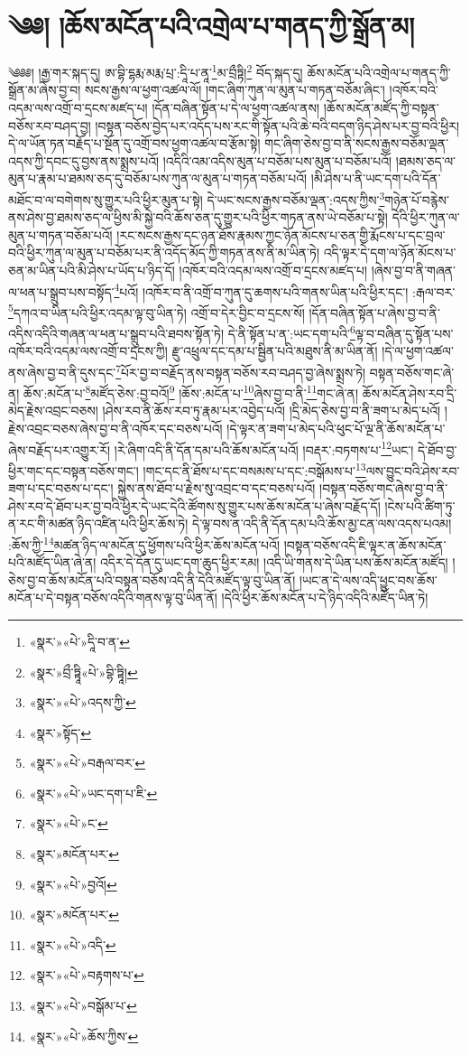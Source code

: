 \chapter{༄༅། །ཆོས་མངོན་པའི་འགྲེལ་པ་གནད་ཀྱི་སྒྲོན་མ།}༄༅༅། །རྒྱ་གར་སྐད་དུ། ཨ་བྷི་དྷརྨ་མརྨ་པྲ་:དཱི་པ་ནཱ་\footnote{«སྣར་»«པེ་»དཱི་བ་ན་}མ་བྲྀཏྟི།\footnote{«སྣར་»བྲྀ་ཏྟཱི«པེ་»བྷི་ཏྟཱི།} བོད་སྐད་དུ། ཆོས་མངོན་པའི་འགྲེལ་པ་གནད་ཀྱི་སྒྲོན་མ་ཞེས་བྱ་བ། སངས་རྒྱས་ལ་ཕྱག་འཚལ་ལོ། །གང་ཞིག་ཀུན་ལ་མུན་པ་གཏན་བཅོམ་ཞིང་། །འཁོར་བའི་འདམ་ལས་འགྲོ་བ་དྲངས་མཛད་པ། །དོན་བཞིན་སྟོན་པ་དེ་ལ་ཕྱག་འཚལ་ནས། །ཆོས་མངོན་མཛོད་ཀྱི་བསྟན་བཅོས་རབ་བཤད་བྱ། །བསྟན་བཅོས་བྱེད་པར་འདོད་པས་རང་གི་སྟོན་པའི་ཆེ་བའི་བདག་ཉིད་ཤེས་པར་བྱ་བའི་ཕྱིར། དེ་ལ་ཡོན་ཏན་བརྗོད་པ་སྔོན་དུ་འགྲོ་བས་ཕྱག་འཚལ་བ་རྩོམ་སྟེ། གང་ཞིག་ཅེས་བྱ་བ་ནི་སངས་རྒྱས་བཅོམ་ལྡན་འདས་ཀྱི་དབང་དུ་བྱས་ནས་སྨྲས་པའོ། །འདིའི་འམ་འདིས་མུན་པ་བཅོམ་པས་མུན་པ་བཅོམ་པའོ། །ཐམས་ཅད་ལ་མུན་པ་རྣམ་པ་ཐམས་ཅད་དུ་བཅོམ་པས་ཀུན་ལ་མུན་པ་གཏན་བཅོམ་པའོ། །མི་ཤེས་པ་ནི་ཡང་དག་པའི་དོན་མཐོང་བ་ལ་བགེགས་སུ་གྱུར་པའི་ཕྱིར་མུན་པ་སྟེ། དེ་ཡང་སངས་རྒྱས་བཅོམ་ལྡན་:འདས་ཀྱིས་\footnote{«སྣར་»«པེ་»འདས་ཀྱི་}གཉེན་པོ་བརྙེས་ནས་ཤེས་བྱ་ཐམས་ཅད་ལ་ཕྱིས་མི་སྐྱེ་བའི་ཆོས་ཅན་དུ་གྱུར་པའི་ཕྱིར་གཏན་ནས་ཡེ་བཅོམ་པ་སྟེ། དེའི་ཕྱིར་ཀུན་ལ་མུན་པ་གཏན་བཅོམ་པའོ། །རང་སངས་རྒྱས་དང་ཉན་ཐོས་རྣམས་ཀྱང་ཉོན་མོངས་པ་ཅན་གྱི་རྨོངས་པ་དང་བྲལ་བའི་ཕྱིར་ཀུན་ལ་མུན་པ་བཅོམ་པར་ནི་འདོད་མོད་ཀྱི་གཏན་ནས་ནི་མ་ཡིན་ཏེ། འདི་ལྟར་དེ་དག་ལ་ཉོན་མོངས་པ་ཅན་མ་ཡིན་པའི་མི་ཤེས་པ་ཡོད་པ་ཉིད་དོ། །འཁོར་བའི་འདམ་ལས་འགྲོ་བ་དྲངས་མཛད་པ། །ཞེས་བྱ་བ་ནི་གཞན་ལ་ཕན་པ་སྒྲུབ་པས་བསྟོད་\footnote{«སྣར་»སྟོད་}པའོ། །འཁོར་བ་ནི་འགྲོ་བ་ཀུན་དུ་ཆགས་པའི་གནས་ཡིན་པའི་ཕྱིར་དང་། :རྒལ་བར་\footnote{«སྣར་»«པེ་»བརྒལ་བར་}དཀའ་བ་ཡིན་པའི་ཕྱིར་འདམ་ལྟ་བུ་ཡིན་ཏེ། འགྲོ་བ་དེར་བྱིང་བ་དྲངས་སོ། །དོན་བཞིན་སྟོན་པ་ཞེས་བྱ་བ་ནི་འདིས་འདིའི་གཞན་ལ་ཕན་པ་སྒྲུབ་པའི་ཐབས་སྟོན་ཏེ། དེ་ནི་སྟོན་པ་ན་:ཡང་དག་པའི་\footnote{«སྣར་»«པེ་»ཡང་དག་པ་ཇི་}ལྟ་བ་བཞིན་དུ་སྟོན་པས་འཁོར་བའི་འདམ་ལས་འགྲོ་བ་དྲངས་ཀྱི། རྫུ་འཕྲུལ་དང་དམ་པ་སྦྱིན་པའི་མཐུས་ནི་མ་ཡིན་ནོ། །དེ་ལ་ཕྱག་འཚལ་ནས་ཞེས་བྱ་བ་ནི་དུས་དང་\footnote{«སྣར་»«པེ་»ང་}པོར་བྱ་བ་བརྗོད་ནས་བསྟན་བཅོས་རབ་བཤད་བྱ་ཞེས་སྨྲས་ཏེ། བསྟན་བཅོས་གང་ཞེ་ན། ཆོས་:མངོན་པ་\footnote{«སྣར་»མངོན་པར་}མཛོད་ཅེས་:བྱ་བའོ།\footnote{«སྣར་»«པེ་»བྱའོ།} །ཆོས་:མངོན་པ་\footnote{«སྣར་»མངོན་པར་}ཞེས་བྱ་བ་ནི་\footnote{«སྣར་»«པེ་»འདི་}གང་ཞེ་ན། ཆོས་མངོན་ཤེས་རབ་དྲི་མེད་རྗེས་འབྲང་བཅས། །ཤེས་རབ་ནི་ཆོས་རབ་ཏུ་རྣམ་པར་འབྱེད་པའོ། །དྲི་མེད་ཅེས་བྱ་བ་ནི་ཟག་པ་མེད་པའོ། །རྗེས་འབྲང་བཅས་ཞེས་བྱ་བ་ནི་འཁོར་དང་བཅས་པའོ། །དེ་ལྟར་ན་ཟག་པ་མེད་པའི་ཕུང་པོ་ལྔ་ནི་ཆོས་མངོན་པ་ཞེས་བརྗོད་པར་འགྱུར་རོ། །རེ་ཞིག་འདི་ནི་དོན་དམ་པའི་ཆོས་མངོན་པའོ། །བརྡར་:བཏགས་པ་\footnote{«སྣར་»«པེ་»བརྟགས་པ་}ཡང་། དེ་ཐོབ་བྱ་ཕྱིར་གང་དང་བསྟན་བཅོས་གང་། །གང་དང་ནི་ཐོས་པ་དང་བསམས་པ་དང་:བསྒོམས་པ་\footnote{«སྣར་»«པེ་»བསྒོམ་པ་}ལས་བྱུང་བའི་ཤེས་རབ་ཟག་པ་དང་བཅས་པ་དང་། སྐྱེས་ནས་ཐོབ་པ་རྗེས་སུ་འབྲང་བ་དང་བཅས་པའོ། །བསྟན་བཅོས་གང་ཞེས་བྱ་བ་ནི་ཤེས་རབ་དེ་ཐོབ་པར་བྱ་བའི་ཕྱིར་དེ་ཡང་དེའི་ཚོགས་སུ་གྱུར་པས་ཆོས་མངོན་པ་ཞེས་བརྗོད་དོ། །ངེས་པའི་ཚིག་ཏུ་ན་རང་གི་མཚན་ཉིད་འཛིན་པའི་ཕྱིར་ཆོས་ཏེ། དེ་ལྟ་བས་ན་འདི་ནི་དོན་དམ་པའི་ཆོས་མྱ་ངན་ལས་འདས་པའམ། :ཆོས་ཀྱི་\footnote{«སྣར་»«པེ་»ཆོས་ཀྱིས་}མཚན་ཉིད་ལ་མངོན་དུ་ཕྱོགས་པའི་ཕྱིར་ཆོས་མངོན་པའོ། །བསྟན་བཅོས་འདི་ཇི་ལྟར་ན་ཆོས་མངོན་པའི་མཛོད་ཡིན་ཞེ་ན། འདིར་དེ་དོན་དུ་ཡང་དག་ཆུད་ཕྱིར་རམ། །འདི་ཡི་གནས་དེ་ཡིན་པས་ཆོས་མངོན་མཛོད། །ཅེས་བྱ་བ་ཆོས་མངོན་པའི་བསྟན་བཅོས་འདི་ནི་དེའི་མཛོད་ལྟ་བུ་ཡིན་ནོ། །ཡང་ན་དེ་ལས་འདི་ཕྱུང་བས་ཆོས་མངོན་པ་དེ་བསྟན་བཅོས་འདིའི་གནས་ལྟ་བུ་ཡིན་ནོ། །དེའི་ཕྱིར་ཆོས་མངོན་པ་དེ་ཉིད་འདིའི་མཛོད་ཡིན་ཏེ། 